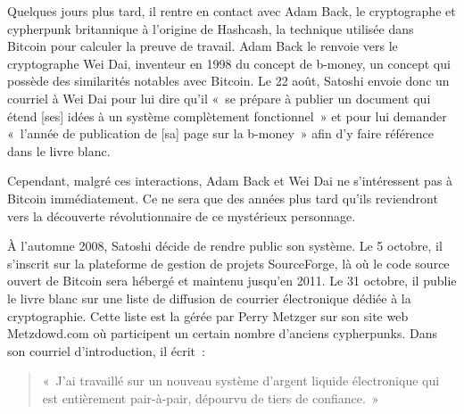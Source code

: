 Quelques jours plus tard, il rentre en contact avec Adam Back, le cryptographe et cypherpunk britannique à l'origine de Hashcash, la technique utilisée dans Bitcoin pour calculer la preuve de travail. Adam Back le renvoie vers le cryptographe Wei Dai, inventeur en 1998 du concept de b-money, un concept qui possède des similarités notables avec Bitcoin. Le 22 août, Satoshi envoie donc un courriel à Wei Dai pour lui dire qu'il «~se prépare à publier un document qui étend [ses] idées à un système complètement fonctionnel~» et pour lui demander «~l'année de publication de [sa] page sur la b-money~» afin d'y faire référence dans le livre blanc.

Cependant, malgré ces interactions, Adam Back et Wei Dai ne s'intéressent pas à Bitcoin immédiatement. Ce ne sera que des années plus tard qu'ils reviendront vers la découverte révolutionnaire de ce mystérieux personnage.


À l'automne 2008, Satoshi décide de rendre public son système. Le 5 octobre, il s'inscrit sur la plateforme de gestion de projets SourceForge, là où le code source ouvert de Bitcoin sera hébergé et maintenu jusqu'en 2011. Le 31 octobre, il publie le livre blanc sur une liste de diffusion de courrier électronique dédiée à la cryptographie. Cette liste est la  gérée par Perry Metzger sur son site web Metzdowd.com où participent un certain nombre d'anciens cypherpunks. Dans son courriel d'introduction, il écrit~:

\begin{quote}
«~J'ai travaillé sur un nouveau système d'argent liquide électronique qui est entièrement pair-à-pair, dépourvu de tiers de confiance.~»
\end{quote}

